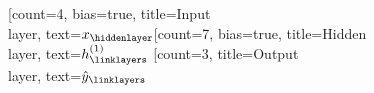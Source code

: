 \documentclass{article}
\begin{document}
\section{}



\section{}
\begin{latin}
\begin{neuralnetwork}[height=9]
    \newcommand{\x}[2]{$x_#2$}
    \newcommand{\y}[2]{$\hat{y}_#2$}
    \newcommand{\hfirst}[2]{\small $h^{(1)}_#2$}
    \newcommand{\hsecond}[2]{\small $h^{(2)}_#2$}
    [count=4, bias=true, title=Input\\layer, text=\x]
    \hiddenlayer[count=7, bias=true, title=Hidden\\layer, text=\hfirst] \linklayers
    \outputlayer[count=3, title=Output\\layer, text=\y] \linklayers
\end{neuralnetwork}
\end{latin}


\section{}


\section{}


\end{document}

